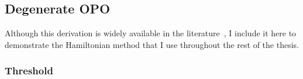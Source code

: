 


\subsection{Degenerate OPO}

Although this derivation is widely available in the literature~\cite{}, I include it here to demonstrate the Hamiltonian method that I use throughout the rest of the thesis. 



\subsubsection{Threshold}


